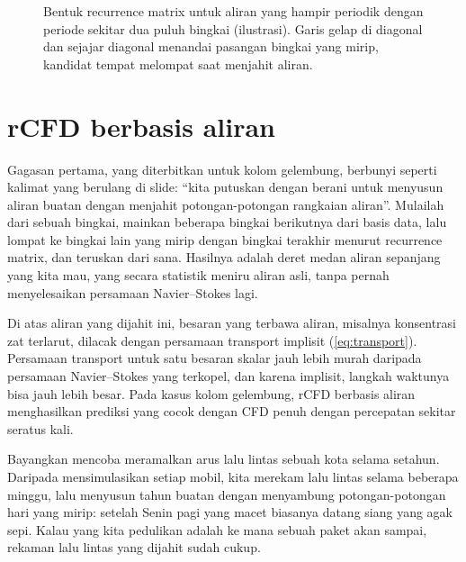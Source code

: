 \begin{figure}[ht]
\centering
{}
\caption{Bentuk recurrence matrix untuk aliran yang hampir periodik dengan periode sekitar dua puluh bingkai (ilustrasi).
Garis gelap di diagonal dan sejajar diagonal menandai pasangan bingkai yang mirip, kandidat tempat melompat saat
menjahit aliran.}
\label{fig:recurrence}
\end{figure}

\section{rCFD berbasis aliran}

Gagasan pertama, yang diterbitkan \citet{lichtenegger2016} untuk kolom gelembung, berbunyi seperti
kalimat yang berulang di slide: ``kita putuskan dengan berani untuk menyusun aliran buatan dengan
menjahit potongan-potongan rangkaian aliran''. Mulailah dari sebuah bingkai, mainkan beberapa bingkai
berikutnya dari basis data, lalu lompat ke bingkai lain yang mirip dengan bingkai terakhir menurut
recurrence matrix, dan teruskan dari sana. Hasilnya adalah deret medan aliran sepanjang yang kita mau,
yang secara statistik meniru aliran asli, tanpa pernah menyelesaikan persamaan Navier--Stokes lagi.

Di atas aliran yang dijahit ini, besaran yang terbawa aliran, misalnya konsentrasi zat terlarut, dilacak
dengan persamaan transport implisit (\cref{eq:transport}). Persamaan transport untuk satu besaran skalar
jauh lebih murah daripada persamaan Navier--Stokes yang terkopel, dan karena implisit, langkah waktunya
bisa jauh lebih besar. Pada kasus kolom gelembung, rCFD berbasis aliran menghasilkan prediksi yang cocok
dengan CFD penuh dengan percepatan sekitar seratus kali.

Bayangkan mencoba meramalkan arus lalu lintas sebuah kota selama setahun. Daripada mensimulasikan setiap
mobil, kita merekam lalu lintas selama beberapa minggu, lalu menyusun tahun buatan dengan menyambung
potongan-potongan hari yang mirip: setelah Senin pagi yang macet biasanya datang siang yang agak sepi.
Kalau yang kita pedulikan adalah ke mana sebuah paket akan sampai, rekaman lalu lintas yang dijahit sudah
cukup.

